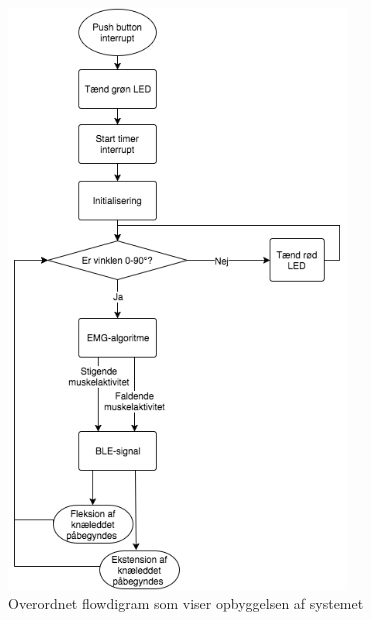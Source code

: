 \begin{figure}[H]
\centering
\includegraphics[width=0.8\textwidth]{figures/implementering/overordnet_flow.png}
\caption{Overordnet flowdigram som viser opbyggelsen af systemet}
\label{fig:overordnet_flow}
\end{figure}



